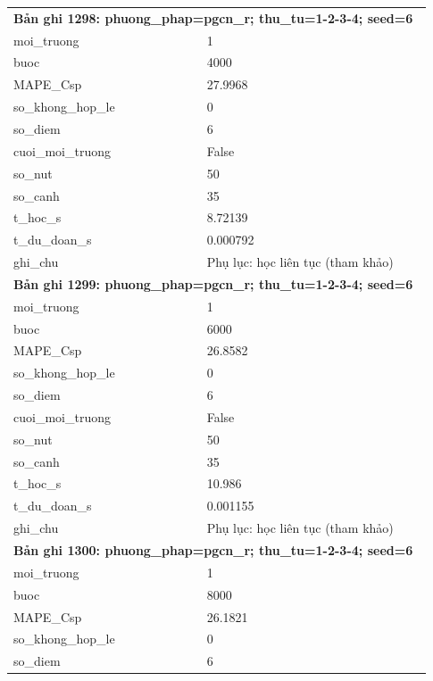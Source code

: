 \begin{longtable}{p{0.43\linewidth}p{0.50\linewidth}}
\midrule
\multicolumn{2}{p{0.95\linewidth}}{\textbf{Bản ghi 1298: phuong\_phap=pgcn\_r; thu\_tu=1-2-3-4; seed=6}} \\
moi\_\allowbreak truong & 1 \\
buoc & 4000 \\
MAPE\_\allowbreak Csp & 27.9968 \\
so\_\allowbreak khong\_\allowbreak hop\_\allowbreak le & 0 \\
so\_\allowbreak diem & 6 \\
cuoi\_\allowbreak moi\_\allowbreak truong & False \\
so\_\allowbreak nut & 50 \\
so\_\allowbreak canh & 35 \\
t\_\allowbreak hoc\_\allowbreak s & 8.72139 \\
t\_\allowbreak du\_\allowbreak doan\_\allowbreak s & 0.000792 \\
ghi\_\allowbreak chu & Phụ lục: học liên tục (tham khảo) \\
\midrule
\multicolumn{2}{p{0.95\linewidth}}{\textbf{Bản ghi 1299: phuong\_phap=pgcn\_r; thu\_tu=1-2-3-4; seed=6}} \\
moi\_\allowbreak truong & 1 \\
buoc & 6000 \\
MAPE\_\allowbreak Csp & 26.8582 \\
so\_\allowbreak khong\_\allowbreak hop\_\allowbreak le & 0 \\
so\_\allowbreak diem & 6 \\
cuoi\_\allowbreak moi\_\allowbreak truong & False \\
so\_\allowbreak nut & 50 \\
so\_\allowbreak canh & 35 \\
t\_\allowbreak hoc\_\allowbreak s & 10.986 \\
t\_\allowbreak du\_\allowbreak doan\_\allowbreak s & 0.001155 \\
ghi\_\allowbreak chu & Phụ lục: học liên tục (tham khảo) \\
\midrule
\multicolumn{2}{p{0.95\linewidth}}{\textbf{Bản ghi 1300: phuong\_phap=pgcn\_r; thu\_tu=1-2-3-4; seed=6}} \\
moi\_\allowbreak truong & 1 \\
buoc & 8000 \\
MAPE\_\allowbreak Csp & 26.1821 \\
so\_\allowbreak khong\_\allowbreak hop\_\allowbreak le & 0 \\
so\_\allowbreak diem & 6 \\

\end{longtable}
